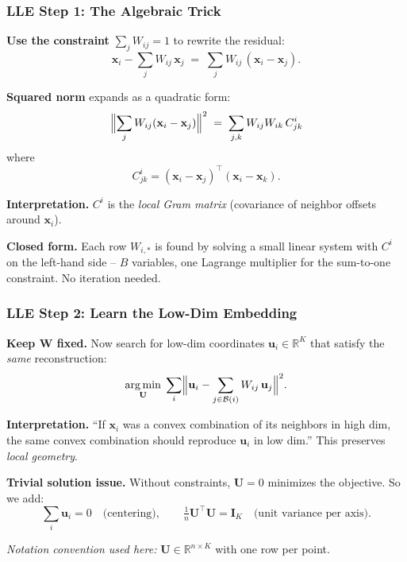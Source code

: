 \documentclass[notes,11pt, aspectratio=169]{beamer}
\DeclareMathOperator*{\argmin}{arg\,min}
\newcommand{\vu}{\mathbf{u}}
\newcommand{\vx}{\mathbf{x}}
\newcommand{\vU}{\mathbf{U}}
\newcommand{\vW}{\mathbf{W}}
\newcommand{\R}{\mathbb{R}}
\begin{document}
\begin{frame}
\frametitle{LLE Step 1: The Algebraic Trick}

\textbf{Use the constraint} $\sum_j W_{ij} = 1$ to rewrite the residual:
\[
    \vx_i - \sum_j W_{ij}\, \vx_j
    \;=\; \sum_j W_{ij}\, (\vx_i - \vx_j).
\]

\vspace{6pt}
\textbf{Squared norm} expands as a quadratic form:
\[
    \Bigl\| \sum_j W_{ij} (\vx_i - \vx_j) \Bigr\|^2
    \;=\; \sum_{j, k} W_{ij} W_{ik}\, C^i_{jk}
\]
where
\[
    C^i_{jk} = (\vx_i - \vx_j)^\top (\vx_i - \vx_k).
\]

\vspace{8pt}
\textbf{Interpretation.} $C^i$ is the \emph{local Gram matrix} (covariance of neighbor offsets around $\vx_i$).

\vspace{6pt}
\textbf{Closed form.} Each row $W_{i,*}$ is found by solving a small linear system with $C^i$ on the left-hand side -- $B$ variables, one Lagrange multiplier for the sum-to-one constraint. No iteration needed.
\end{frame}

\begin{frame}
\frametitle{LLE Step 2: Learn the Low-Dim Embedding}

\textbf{Keep $\vW$ fixed.} Now search for low-dim coordinates $\vu_i \in \R^K$ that satisfy the \emph{same} reconstruction:
\[
    \argmin_{\vU} \;\sum_i \Bigl\| \vu_i - \sum_{j \in \mathcal{B}(i)} W_{ij}\, \vu_j \Bigr\|^2.
\]

\vspace{6pt}
\textbf{Interpretation.} ``If $\vx_i$ was a convex combination of its neighbors in high dim, the same convex combination should reproduce $\vu_i$ in low dim.'' This preserves \emph{local geometry}.

\vspace{8pt}
\textbf{Trivial solution issue.} Without constraints, $\vU = 0$ minimizes the objective. So we add:
\[
    \sum_i \vu_i = 0 \quad\text{(centering)}, \qquad
    \tfrac{1}{n} \vU^\top \vU = \mathbf{I}_K \quad\text{(unit variance per axis)}.
\]

\vspace{4pt}
\textit{Notation convention used here:} $\vU \in \R^{n \times K}$ with one row per point.
\end{frame}
\end{document}
